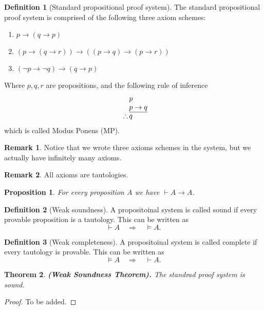\documentclass[11pt,a4paper]{article}
\theoremstyle{definition}
\newtheorem{definition}{Definition}[section]
\newtheorem{remark}{Remark}[section]
\theoremstyle{plain}
\newtheorem{theorem}{Theorem}[section]
\newtheorem{proposition}[theorem]{Proposition}
\renewcommand{\tt}[1]{\textnormal{\textbf{(#1).}}} %
\renewcommand{\implies}{\rightarrow}
\begin{document}
  \begin{definition}[Standard propositional proof system]
    The standard propositional proof system is comprised of the
    following three axiom schemes:
    \begin{enumerate}
      \item[(1)] $p\to (q\to p)$
      \item[(2)] $(p\to (q\to r))\to ((p\to q)\to (p\to r))$
      \item[(3)] $(\neg p\to \neg q)\to (q\to p)$
    \end{enumerate}
    Where $p,q,r$ are propositions,
    and the following rule of inference
    \[
      \begin{array}{c@{\,}l@{}}
                  & p         \\
                  & p \to q   \\ \cline{2-2}
      \therefore  & q
      \end{array}
    \]
    which is called Modus Ponens (MP).
  \end{definition}
  \begin{remark}
    Notice that we wrote three axioms schemes in the system, but we
    actually have infinitely many axioms.
  \end{remark}
  \begin{remark}
    All axioms are tautologies.
  \end{remark}

  \begin{proposition}
    For every proposition $A$ we have $\vdash A \implies A$.
  \end{proposition}

  \begin{definition}[Weak soundness]
    A propositoinal system is called sound if every provable proposition
    is a tautology. This can be written as
    \[
      \vdash A \quad\Rightarrow\quad \models A.
    \]
  \end{definition}

  \begin{definition}[Weak completeness]
    A propositoinal system is called complete if every tautology is
    provable. This can be written as
    \[
      \models A \quad\Rightarrow\quad \vdash A.
    \]
  \end{definition}

  \begin{theorem}\label{thm:weak-soundness}\tt{Weak Soundness Theorem}
    The standrad proof system is sound.
  \end{theorem}
  \begin{proof}
    To be added.
  \end{proof}
\end{document}
